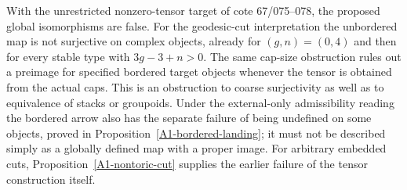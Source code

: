 \begin{theorem}\label{A1-global-refutation}
With the unrestricted nonzero-tensor target of cote 67/075--078,
the proposed global isomorphisms are false. For the geodesic-cut
interpretation the unbordered map is not surjective on complex objects,
already for $(g,n)=(0,4)$ and then for every stable type with
$3g-3+n>0$. The same cap-size obstruction rules out a preimage for
specified bordered target objects whenever the tensor is obtained
from the actual caps. This is an obstruction to coarse surjectivity
as well as to equivalence of stacks or groupoids. Under the external-only
admissibility reading the bordered arrow also has the separate failure
of being undefined on some objects, proved in
Proposition~\ref{A1-bordered-landing}; it must not be described simply
as a globally defined map with a proper image. For arbitrary embedded
cuts, Proposition~\ref{A1-nontoric-cut} supplies the earlier failure
of the tensor construction itself.
\end{theorem}
